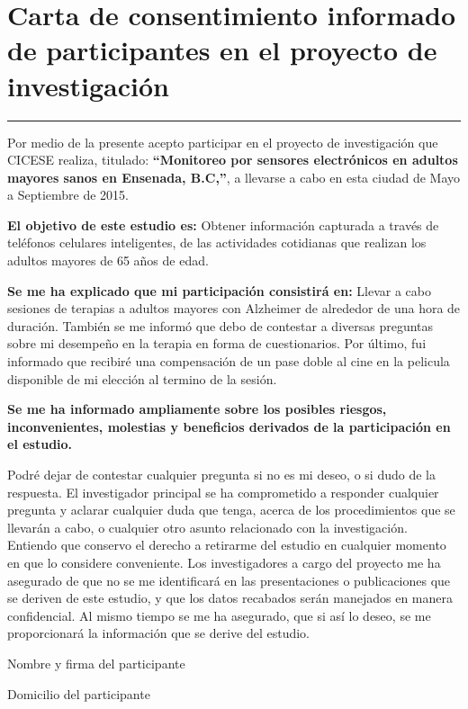 \appendix{}

\chapter{Carta de consentimiento informado de participantes en el proyecto de investigaci\'on} \label{aped:A}
\vspace{-3ex}%
\noindent
\rule{\textwidth}{1pt}
\vspace{-2ex}%

Por medio de la presente acepto participar en el proyecto de investigación que CICESE realiza, titulado: \textbf{``Monitoreo por sensores electrónicos en adultos mayores sanos en Ensenada, B.C,''}, a llevarse a cabo en esta ciudad de Mayo a Septiembre de 2015.

\textbf{El objetivo de este estudio es:} Obtener información capturada a través de teléfonos celulares  inteligentes, de las actividades cotidianas que realizan los adultos mayores de 65 años de edad.

\textbf{Se me ha explicado que mi participación consistirá en:}  Llevar a cabo sesiones de terapias a adultos mayores con Alzheimer de alrededor de una hora de duración. También se me informó que debo de contestar a diversas preguntas sobre mi desempeño en la terapia en forma de cuestionarios. Por último, fui informado que recibiré una compensación de un pase doble al cine en la pelicula disponible de mi elección al termino de la sesión.

\textbf{Se me ha informado ampliamente sobre los posibles riesgos, inconvenientes, molestias y beneficios derivados de la participación en el estudio.}

Podré dejar de contestar cualquier pregunta  si no es mi deseo, o si dudo de la respuesta.
El investigador principal se ha comprometido a responder cualquier pregunta y aclarar cualquier duda que tenga, acerca de los procedimientos que se llevarán a cabo, o cualquier otro asunto relacionado con la investigación.
Entiendo que conservo el derecho a retirarme del estudio en cualquier momento en que lo considere conveniente.
Los investigadores a cargo del proyecto me ha asegurado de que no se me identificará en las presentaciones o publicaciones que se deriven de este estudio, y que los datos recabados  serán manejados en manera confidencial. Al mismo tiempo se me ha asegurado, que si así lo deseo, se me proporcionará la información que se derive del estudio.

Nombre y firma del participante

Domicilio del participante
